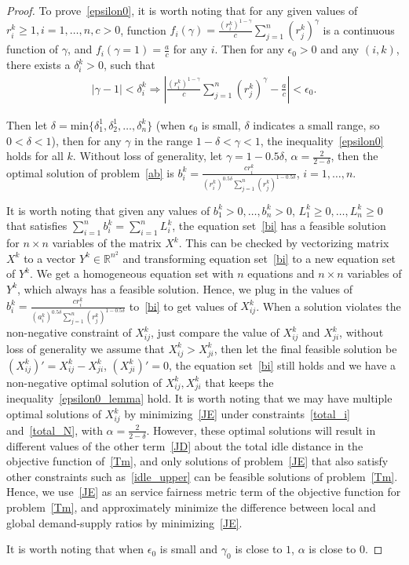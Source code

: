 \documentclass[10pt,twocolumn,twoside,english]{IEEEtran}
\begin{document}
\begin{proof}
To prove~\eqref{epsilon0}, it is worth noting that for any given values of $r^k_i \geqslant 1,i=1,\dots,n, c>0$, function $f_i(\gamma)=\frac{(r^k_i)^{1-\gamma}}{c} \sum\limits_{j=1}^{n}(r^k_j)^{\gamma}$ is a continuous function of $\gamma$, and $f_i(\gamma=1)=\frac{a}{c}$ for any $i$. Then for any $\epsilon_0>0$ and any $(i, k)$, there exists a $\delta^k_i >0$, such that
\begin{align*}
	|\gamma-1| < \delta^k_i \Rightarrow \left|\frac{(r^k_i)^{1-\gamma}}{c} \sum\limits_{j=1}^{n}(r^k_j)^{\gamma}-\frac{a}{c} \right| < \epsilon_0. 
\end{align*} 


Then let $\delta=\text{min}\{\delta_1^1, \delta_2^1,\dots,\delta^k_n\}$ (when $\epsilon_0$ is small, $\delta$ indicates a small range, so $0<\delta <1$), then for any $\gamma$ in the range $1-\delta <\gamma <1$, the inequality~\eqref{epsilon0} holds for all $k$. Without loss of generality, let $\gamma=1-0.5 \delta$, $\alpha=\frac{2}{2-\delta}$, then the optimal solution of problem~\eqref{ab} is $b_i^k=\frac{cr_i^k}{(r^k_i)^{0.5\delta}\sum\limits_{j=1}^{n}(r^k_j)^{1-0.5\delta}}$, $i=1,\dots,n$.

It is worth noting that given any values of $b^k_1>0, \dots, b^k_n>0$, $L^k_1\geqslant 0, \dots, L^k_n\geqslant 0$ that satisfies $\sum\limits_{i=1}^n b^k_i=\sum\limits_{i=1}^n L^k_i$, the equation set~\eqref{bi} has a feasible solution for $n\times n$ variables of the matrix $X^k$. This can be checked by vectorizing matrix $X^k$ to a vector $Y^k \in \mathbb{R}^{n^2}$ and transforming equation set~\eqref{bi} to a new equation set of $Y^k$. We get a homogeneous equation set with $n$ equations and $n \times n$ variables of $Y^k$, which always has a feasible solution. Hence, we plug in the values of $b_i^k=\frac{cr_i^k}{(a^k_i)^{0.5\delta}\sum\limits_{j=1}^{n}(r^k_j)^{1-0.5\delta}}$ to~\eqref{bi} to get values of $X^k_{ij}$. When a solution violates the non-negative constraint of $X_{ij}^k$, just compare the value of $X_{ij}^k$ and $X_{ji}^k$, without loss of generality we assume that $X_{ij}^k > X_{ji}^k$, then let the final feasible solution be $(X_{ij}^k)' = X_{ij}^k-X_{ji}^k$, $(X_{ji}^k)'=0$, the equation set~\eqref{bi} still holds and we have a non-negative optimal solution of $X^k_{ij}, X^k_{ji}$ that keeps the inequality~\eqref{epsilon0_lemma} hold. It is worth noting that we may have multiple optimal solutions of $X^k_{ij}$ by minimizing~\eqref{JE} under constraints~\eqref{total_i} and~\eqref{total_N}, with $\alpha=\frac{2}{2-\delta}$. However, these optimal solutions will result in different values of the other term~\eqref{JD} about the total idle distance in the objective function of~\eqref{Tm}, and only solutions of problem~\eqref{JE} that also satisfy other constraints such as~\eqref{idle_upper} can be feasible solutions of problem~\eqref{Tm}. Hence, we use~\eqref{JE} as an service fairness metric term of the objective function for problem~\eqref{Tm}, and approximately minimize the difference between local and global demand-supply ratios by minimizing~\eqref{JE}.


It is worth noting that when $\epsilon_0$ is small and $\gamma_0$ is close to $1$, $\alpha$ is close to 0.
\end{proof}
\end{document}
